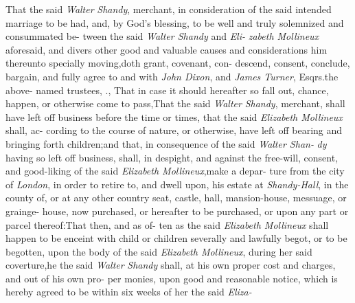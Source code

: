 \documentclass{article}
\begin{document}
\indent\lqq{}\break
\lqq {}\quad That the said \textit{Walter}\break
\lqq \textit{Shandy}, merchant, in consideration of\break
\lqq the said intended marriage to be had,\break
\lqq and, by God’s blessing, to be well and 
\lqq truly solemnized and consummated be-\break
\lqq tween the said \textit{Walter Shandy} and \textit{Eli-}\break
\lqq \textit{zabeth Mollineux} aforesaid, and divers\break
\lqq other good and valuable causes and\break
\lqq considerations him thereunto specially\break
\lqq moving,\tsk doth grant, covenant, con-\break
\lqq descend, consent, conclude, bargain,\break
\lqq and fully agree to and with \textit{John Dixon},\break
\lqq and \textit{James Turner}, Esqrs.\@ the above-\break
\lqq named trustees, \etc \etc.\tsk{},\tsk\break
\lqq That in case it should hereafter so fall\break
\lqq out, chance, happen, or otherwise\break
\lqq come to pass,\tsk That the said \textit{Walter}\break
\lqq \textit{Shandy}, merchant, shall have left off\break
\lqq business before the time or times, that\break
\lqq the said \textit{Elizabeth Mollineux} shall, ac-\break
\lqq cording to the course of nature, or\break
\lqq otherwise, have left off bearing and\break
\lqq bringing forth children;\tsk and that,\break
\lqq in consequence of the said \textit{Walter Shan-}\break
\lqq \textit{dy} having so left off business, shall, 
\lqq in despight, and against the free-will,\break
\lqq consent, and good-liking of the said\break
\lqq \textit{Elizabeth Mollineux},\tsk make a depar-\break
\lqq ture from the city of \textit{London}, in order\break
\lqq to retire to, and dwell upon, his estate\break
\lqq at \textit{Shandy-Hall}, in the county of\tsh,\break
\lqq or at any other country seat, castle, hall,\break
\lqq mansion-house, messuage, or grainge-\break
\lqq house, now purchased, or hereafter to\break
\lqq be purchased, or upon any part or\break
\lqq parcel thereof:\tsk That then, and as of-\break
\lqq ten as the said \textit{Elizabeth Mollineux} shall\break
\lqq happen to be enceint with child or\break
\lqq children severally and lawfully begot,\break
\lqq or to be begotten, upon the body of\break
\lqq the said \textit{Elizabeth Mollineux}, during her\break
\lqq said coverture,\tsk he the said \textit{Walter}\break
\lqq \textit{Shandy} shall, at his own proper cost\break
\lqq and charges, and out of his own pro-\break
\lqq per monies, upon good and reasonable\break
\lqq notice, which is hereby agreed to be 
\lqq within six weeks of her the said \textit{Eliza-}\break
\end{document}
